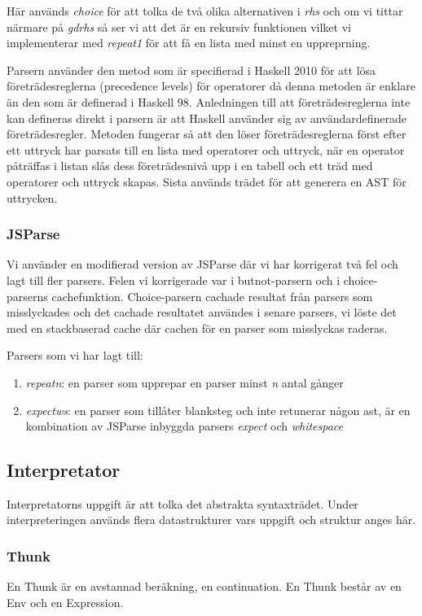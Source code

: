 Här används \emph{choice} för att tolka de två olika alternativen i \emph{rhs} och om vi tittar närmare på \emph{gdrhs} 
så ser vi att det är en rekursiv funktionen vilket vi implementerar med \emph{repeat1} för att få en lista med minst en uppreprning.

Parsern använder den metod som är specifierad i Haskell 2010 \citep{haskell2010} för att lösa företrädesreglerna (precedence levels) för operatorer då denna metoden är enklare än den som är definerad i Haskell 98. 
Anledningen till att företrädesreglerna inte kan defineras direkt i parsern är att Haskell använder sig av användardefinerade företrädesregler.
Metoden fungerar så att den löser företrädesreglerna först efter ett uttryck har parsats till en lista med operatorer 
och uttryck, när en operator påträffas i listan slås dess företrädesnivå upp i en tabell och ett träd med 
operatorer och uttryck skapas. Sista används trädet för att generera en AST för uttrycken.

\subsubsection{JSParse}
Vi använder en modifierad version av JSParse där vi har korrigerat två fel och lagt till fler parsers. Felen vi korrigerade var i butnot-parsern och i choice-parserns cachefunktion. 
Choice-parsern cachade resultat från parsers som misslyckades och det cachade resultatet användes i senare parsers, 
vi löste det med en stackbaserad cache där cachen för en parser som misslyckas raderas.

Parsers som vi har lagt till:
\begin{enumerate}
    \item{\emph{repeatn}: en parser som upprepar en parser minst \emph{n} antal gånger}
    \item{\emph{expectws}: en parser som tillåter blanksteg och inte retunerar någon ast, är en kombination av JSParse inbyggda parsers \emph{expect} och \emph{whitespace}}
\end{enumerate}



\subsection{Interpretator}
Interpretatorns uppgift är att tolka det abstrakta syntaxträdet. Under interpreteringen används flera datastrukturer vars uppgift och struktur anges här.

\subsubsection{Thunk}
En Thunk är en avstannad beräkning, en continuation. En Thunk består av en Env och en Expression.

